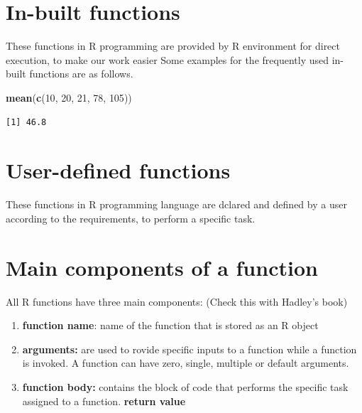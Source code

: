 \documentclass[]{book}
\newenvironment{Shaded}{\begin{snugshade}}{\end{snugshade}}
\newcommand{\DecValTok}[1]{\textcolor[rgb]{0.00,0.00,0.81}{#1}}
\newcommand{\KeywordTok}[1]{\textcolor[rgb]{0.13,0.29,0.53}{\textbf{#1}}}
\newcommand{\NormalTok}[1]{#1}
\begin{document}
\hypertarget{in-built-functions}{%
\section{In-built functions}\label{in-built-functions}}

These functions in R programming are provided by R environment for direct execution, to make our work easier Some examples for the frequently used in-built functions are as follows.

\begin{Shaded}
\begin{Highlighting}[]
\KeywordTok{mean}\NormalTok{(}\KeywordTok{c}\NormalTok{(}\DecValTok{10}\NormalTok{, }\DecValTok{20}\NormalTok{, }\DecValTok{21}\NormalTok{, }\DecValTok{78}\NormalTok{, }\DecValTok{105}\NormalTok{))}
\end{Highlighting}
\end{Shaded}

\begin{verbatim}
[1] 46.8
\end{verbatim}

\hypertarget{user-defined-functions}{%
\section{User-defined functions}\label{user-defined-functions}}

These functions in R programming language are dclared and defined by a user according to the requirements, to perform a specific task.

\hypertarget{main-components-of-a-function}{%
\section{Main components of a function}\label{main-components-of-a-function}}

All R functions have three main components: (Check this with Hadley's book)

\begin{enumerate}
\def\labelenumi{\arabic{enumi}.}
\item
  \textbf{function name}: name of the function that is stored as an R object
\item
  \textbf{arguments:} are used to rovide specific inputs to a function while a function is invoked. A function can have zero, single, multiple or default arguments.
\item
  \textbf{function body:} contains the block of code that performs the specific task assigned to a function. \textbf{return value}
\end{enumerate}
\end{document}
